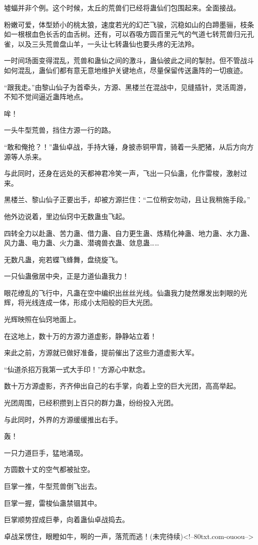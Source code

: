 \begin{this_body}
墟蝠并非个例。这个时候，太丘的荒兽们已经将蛊仙们包围起来。全面接战。

粉嫩可爱，体型娇小的桃太狼，速度若光的幻芒飞骏，沉稳如山的白蹄墨骊，枝条如一根根血色长舌的血舌树。还有，可以吞吸方圆百里元气的气道七转荒兽归元孔雀，以及三头荒兽盘山羊，一头让七转蛊仙也要头疼的无法羚。

一时间场面变得混乱，荒兽和蛊仙之间的激斗，蛊仙彼此之间的掣肘。但不管战斗如何混乱，蛊仙们都有意无意地维护关键地点，尽量保留传送蛊阵的一切痕迹。

“跟我走。”由黎山仙子为首牵头，方源、黑楼兰在混战中，见缝插针，灵活周游，不知不觉间逼近蛊阵地点。

哞！

一头牛型荒兽，挡住方源一行的路。

“敢和俺抢？！”蛊仙卓战，手持大锤，身披赤铜甲胄，骑着一头肥猪，从后方向方源等人杀来。

与此同时，还身在远处的天都神君冷笑一声，飞出一只仙蛊，化作雷梭，激射过来。

黑楼兰、黎山仙子正要出手，却被方源拦住：“二位稍安勿动，且让我稍施手段。”

他外边说着，里边仙窍中无数蛊虫飞起。

四转全力以赴蛊、苦力蛊、借力蛊、自力更生蛊、炼精化神蛊、地力蛊、水力蛊、风力蛊、电力蛊、火力蛊、潜魂兽衣蛊、敛息蛊……

无数凡蛊，宛若蝶飞蜂舞，盘绕旋飞。

一只仙蛊傲居中央，正是力道仙蛊我力！

眼花缭乱的飞行中，凡蛊在空中编织出丝丝光线。仙蛊我力陡然爆发出刺眼的光辉，将光线连成一体，形成小太阳般的巨大光团。

光辉映照在仙窍地面上。

在这地上，数十万的方源力道虚影，静静站立着！

来此之前，方源就已做好准备，提前催出了这些力道虚影大军。

“仙道杀招万我第一式大手印！”方源心中默念。

数十万方源虚影，齐齐伸出自己的右手掌，向着上空的巨大光团，高高举起。

光团周围，已经积攒到上百只的群力蛊，纷纷投入光团。

与此同时，外界的方源缓缓推出右手。

轰！

一只力道巨手，猛地涌现。

方圆数十丈的空气都被扯空。

巨掌一推，牛型荒兽倒飞出去。

巨掌一握，雷梭仙蛊禁锢其中。

巨掌顺势捏成巨拳，向着蛊仙卓战捣去。

卓战呆愣住，眼瞪如牛，啊的一声，落荒而逃！(未完待续)<!--80txt.com-ouoou-->

\end{this_body}

